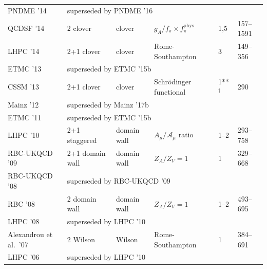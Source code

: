 \begin{table}[!t]
\begin{threeparttable}
\begin{tabular}{llllll}
  PNDME '14 \cite{Bhattacharya:2013ehc} &
  \multicolumn{5}{l}{superseded by PNDME '16} \\

  QCDSF '14 \cite{Horsley:2013ayv} &
  2 clover & clover & $g_A/f_\pi \times f_\pi^\text{phys}$ & 1,5 & 157--1591 \\

  LHPC '14 \cite{Green:2012ud} &
  2+1 clover & clover & Rome-Southampton & 3 & 149--356\\

  ETMC '13 \cite{Alexandrou:2013joa} &
  \multicolumn{5}{l}{superseded by ETMC '15b} \\

  CSSM '13 \cite{Owen:2012ts} &
  2+1 clover & clover & Schr\"odinger functional & 1**$^\dagger$ & 290 \\

  Mainz '12 \cite{Capitani:2012gj} &
  \multicolumn{5}{l}{superseded by Mainz '17b} \\

  ETMC '11 \cite{Alexandrou:2011nr} &
  \multicolumn{5}{l}{superseded by ETMC '15b} \\

  LHPC '10 \cite{Bratt:2010jn} &
  2+1 staggered & domain wall & $A_\mu/\mathcal{A}_\mu$ ratio & 1--2 & 293--758 \\

  RBC-UKQCD '09 \cite{Yamazaki:2009zq} &
  2+1 domain wall & domain wall & $Z_A/Z_V=1$ & 1 & 329--668 \\

  RBC-UKQCD '08 \cite{Yamazaki:2008py} &
  \multicolumn{5}{l}{superseded by RBC-UKQCD '09} \\

  RBC '08 \cite{Lin:2008uz} &
  2 domain wall & domain wall & $Z_A/Z_V=1$ & 1--2 & 493--695 \\

  LHPC '08 \cite{Hagler:2007xi} &
  \multicolumn{5}{l}{superseded by LHPC '10} \\

  Alexandrou et al.\ '07 \cite{Alexandrou:2007xj} &
  2 Wilson & Wilson & Rome-Southampton & 1 & 384--691 \\

  LHPC '06 \cite{Edwards:2005ym} &
  \multicolumn{5}{l}{superseded by LHPC '10} \\


\end{tabular}
\end{threeparttable}
\end{table}
